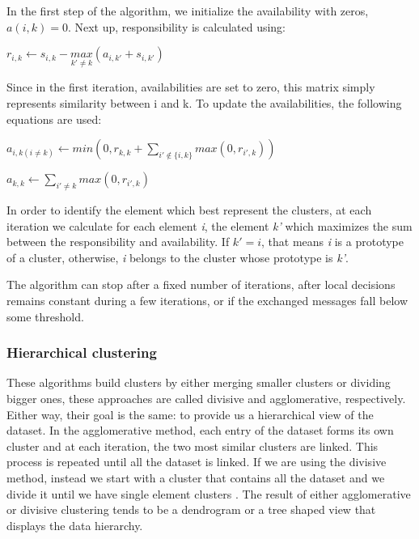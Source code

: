 In the first step of the algorithm, we initialize the availability with zeros, $a(i,k) = 0$. Next up, responsibility is calculated using:

\begin{center}
	$r_{i,k}\leftarrow s_{i,k} -\underset{k'\neq k}{max}(a_{i,k'} + s_{i,k'})$
\end{center}

Since in the first iteration, availabilities are set to zero, this matrix simply represents similarity between i and k. To update the availabilities, the following equations are used: 

\begin{center}
	$a_{i,k(i\neq k)}\leftarrow min\left ( 0, r_{k,k} + \sum\limits_{i'\notin \{ i,k \} }^{} max(0,r_{i',k})  \right)$	
	
	$a_{k,k} \leftarrow \sum\limits_{i'\neq k}^{ } max(0, r_{i',k})$
\end{center}

In order to identify the element which best represent the clusters, at each iteration we calculate for each element \textit{i}, the element \textit{k'} which maximizes the sum between the responsibility and availability. If $k' = i$, that means \textit{i} is a prototype of a cluster, otherwise, \textit{i} belongs to the cluster whose prototype is \textit{k'}.

The algorithm can stop after a fixed number of iterations, after local decisions remains constant during a few iterations, or if the exchanged messages fall below some threshold.

\medskip
\subsubsection{Hierarchical clustering}

These algorithms build clusters by either merging smaller clusters or dividing bigger ones, these approaches are called divisive and agglomerative, respectively. Either way, their goal is the same: to provide us a hierarchical view of the dataset. In the agglomerative method, each entry of the dataset forms its own cluster and at each iteration, the two most similar clusters are linked. This process is repeated until all the dataset is linked. If we are using the divisive method, instead we start with a cluster that contains all the dataset and we divide it until we have single element clusters \cite{jain1999data}. The result of either agglomerative or divisive clustering tends to be a dendrogram or a tree shaped view that displays the data hierarchy. 

